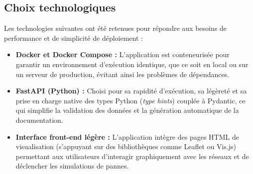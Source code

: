 \subsection{Choix technologiques}
Les technologies suivantes ont été retenues pour répondre aux besoins de performance et de simplicité de déploiement :
\begin{itemize}
    \item \textbf{Docker et Docker Compose :} L'application est conteneurisée pour garantir un environnement d'exécution identique, que ce soit en local ou sur un serveur de production, évitant ainsi les problèmes de dépendances.
    \item \textbf{FastAPI (Python) :} Choisi pour sa rapidité d'exécution, sa légèreté et sa prise en charge native des types Python (\emph{type hints}) couplée à Pydantic, ce qui simplifie la validation des données et la génération automatique de la documentation.
    \item \textbf{Interface front-end légère :} L'application intègre des pages HTML de visualisation (s'appuyant sur des bibliothèques comme Leaflet ou Vis.js) permettant aux utilisateurs d'interagir graphiquement avec les réseaux et de déclencher les simulations de pannes.
\end{itemize}